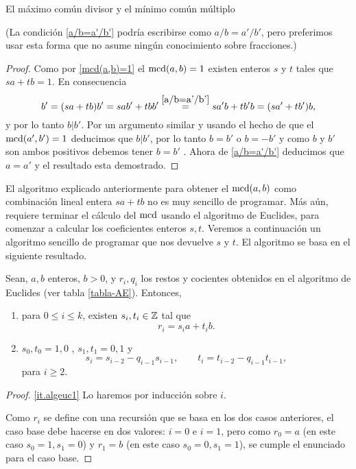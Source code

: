 \begin{section}{El máximo común divisor y el mínimo común múltiplo}
\begin{ejemplo*}
(La condición \ref{a/b=a'/b'} podría escribirse como $a/b=a'/b'$, pero
preferimos usar esta forma que no asume ningún conocimiento sobre
fracciones.)
\end{ejemplo*}
\begin{proof} Como por \ref{mcd(a,b)=1} el $\operatorname{mcd} (a,b) =1$ existen enteros $s$ y $t$
tales que $sa+tb=1$. En consecuencia
$$
b'=(sa+tb)b' =sab'+tbb' \overset{\ref{a/b=a'/b'}}{=} sa'b + tb'b = (sa'+tb')b,
$$
y por lo tanto $b|b'$. Por un argumento similar y usando el hecho
de que el $\operatorname{mcd}(a',b')=1 $ deducimos que $b|b'$, por lo tanto
$b=b'$ o $b=-b'$ y como $b $ y $b'$ son ambos positivos debemos
tener $b=b'$ . Ahora de \ref{a/b=a'/b'} deducimos que $a=a'$ y el resultado
esta demostrado.
\end{proof}


\begin{observacion*}[*]
El  algoritmo explicado anteriormente para obtener el $\operatorname{mcd}(a,b)$ como combinación lineal entera $sa+tb$ no es muy sencillo de programar. Más aún, requiere terminar el cálculo del $\operatorname{mcd}$ usando el algoritmo de Euclides, para comenzar a calcular los coeficientes enteros $s,t$. Veremos a continuación un algoritmo sencillo de programar que nos devuelve $s$ y $t$. El algoritmo se basa en el siguiente resultado. 
\end{observacion*}

\begin{proposicion}\label{prop-alg-euclides-2} Sean, $a,b$ enteros, $b>0$, y $r_i, q_i$ los restos y cocientes obtenidos en el algoritmo de Euclides (ver tabla \ref{tabla-AE}). Entonces, 
\begin{enumerate}[label=\textit{\alph*)}]
    \item\label{it.algeuc1}     para $0 \le i \le k$,  existen $s_i, t_i \in \mathbb Z$ tal que
    \begin{equation*}
    r_i = s_ia + t_ib.
    \end{equation*}
    \item\label{it.algeuc2} $s_0, t_0 = 1, 0$ , $s_1, t_1 = 0, 1$ y 
    \begin{equation}
    s_{i} = s_{i-2} - q_{i-1}  s_{i-1}, \qquad t_{i} = t_{i-2} - q_{i-1}  t_{i-1},
    \end{equation}
    para $i \ge 2$.
\end{enumerate}
\end{proposicion}
\begin{proof}
    \ref{it.algeuc1} Lo haremos por inducción sobre $i$.
    
    Como $r_i$ se define con una recursión que se basa en los dos casos anteriores, el caso base debe hacerse en dos valores: $i=0$ e $i=1$, pero como  $r_0 = a$ (en este caso $s_0=1, s_1 =0$) y $r_1 =b$ (en este caso $s_0=0, s_1 =1$), se cumple el enunciado para el caso base. 
    

\end{proof}
\end{section}
